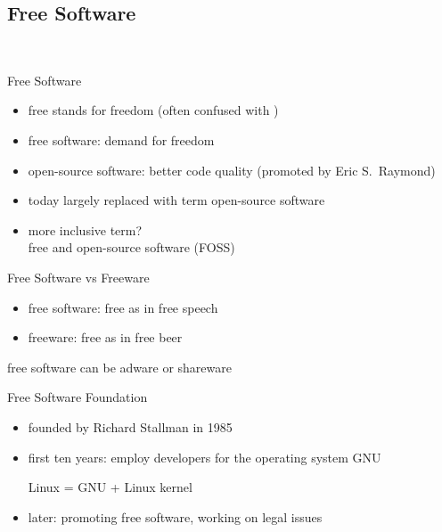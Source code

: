 \subsection{Free Software}
\begin{frame}{\insertsubsection\ }
	\begin{fancycolumns}
		\begin{definition}{Free Software}
			\begin{itemize}
				\item free stands for freedom (often confused with )
				\item free software: demand for freedom
				\item open-source software: better code quality (promoted by Eric S.\ Raymond)
				\item today largely replaced with term open-source software
				\item more inclusive term?\\free and open-source software (FOSS) %
			\end{itemize}
		\end{definition}
		\begin{note}{Free Software vs Freeware}
			\begin{itemize}
				\item free software: free as in free speech
				\item freeware: free as in free beer
			\end{itemize}
			free software can be adware or shareware
		\end{note}
		\nextcolumn
		\begin{definition}{Free Software Foundation }
			\begin{itemize}
				\item founded by Richard Stallman in 1985
				\item first ten years: employ developers for the operating system GNU
				
				Linux = GNU + Linux kernel
				\item later: promoting free software, working on legal issues
			\end{itemize}
		\end{definition}
		\begin{exampletight}{}
			\centering{}
		\end{exampletight}
	\end{fancycolumns}
\end{frame}

